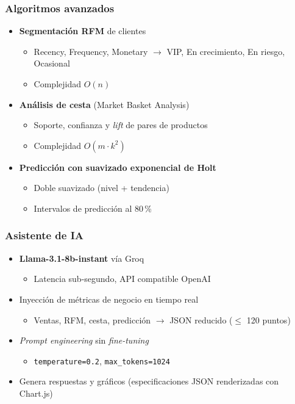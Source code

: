 \documentclass[xcolor=svgnames,aspectratio=169]{beamer}
\begin{document}
\begin{frame}
  \frametitle{Algoritmos avanzados}
  \begin{itemize}
    \item \textbf{Segmentaci\'on RFM} de clientes \smallskip
    \begin{itemize}
      \item Recency, Frequency, Monetary $\to$ VIP, En crecimiento, En riesgo, Ocasional \smallskip
      \item Complejidad $O(n)$
    \end{itemize} \medskip
    \item \textbf{An\'alisis de cesta} (Market Basket Analysis) \smallskip
    \begin{itemize}
      \item Soporte, confianza y \emph{lift} de pares de productos \smallskip
      \item Complejidad $O(m \cdot k^2)$
    \end{itemize} \medskip
    \item \textbf{Predicci\'on con suavizado exponencial de Holt} \smallskip
    \begin{itemize}
      \item Doble suavizado (nivel + tendencia) \smallskip
      \item Intervalos de predicci\'on al 80\,\%
    \end{itemize}
  \end{itemize}
\end{frame}

\begin{frame}
  \frametitle{Asistente de IA}
  \begin{itemize}
    \item \textbf{Llama-3.1-8b-instant} v\'ia Groq \smallskip
    \begin{itemize}
      \item Latencia sub-segundo, API compatible OpenAI
    \end{itemize} \medskip
    \item Inyecci\'on de m\'etricas de negocio en tiempo real \smallskip
    \begin{itemize}
      \item Ventas, RFM, cesta, predicci\'on $\to$ JSON reducido ($\leq$ 120 puntos)
    \end{itemize} \medskip
    \item \emph{Prompt engineering} sin \emph{fine-tuning} \smallskip
    \begin{itemize}
      \item \texttt{temperature=0.2}, \texttt{max\_tokens=1024}
    \end{itemize} \medskip
    \item Genera \alert{respuestas y gr\'aficos} (especificaciones JSON renderizadas con Chart.js)
  \end{itemize}
\end{frame}
\end{document}
